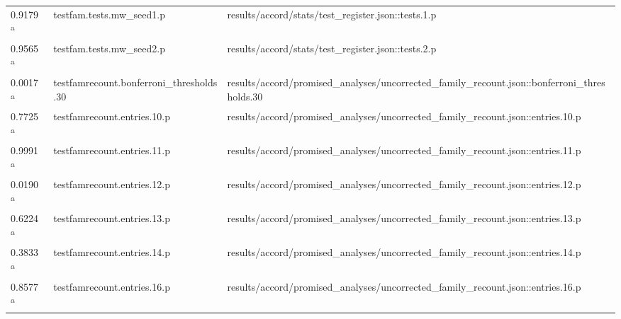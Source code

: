 \begin{longtable}{@{}p{0.7in}p{1.9in}p{2.6in}@{}}
0.9179 \textsuperscript{a} & testfam.\allowbreak{}tests.\allowbreak{}mw\_seed1.\allowbreak{}p & results/\allowbreak{}accord/\allowbreak{}stats/\allowbreak{}test\_register.\allowbreak{}json::tests.\allowbreak{}1.\allowbreak{}p\\
0.9565 \textsuperscript{a} & testfam.\allowbreak{}tests.\allowbreak{}mw\_seed2.\allowbreak{}p & results/\allowbreak{}accord/\allowbreak{}stats/\allowbreak{}test\_register.\allowbreak{}json::tests.\allowbreak{}2.\allowbreak{}p\\
0.0017 \textsuperscript{a} & testfamrecount.\allowbreak{}bonferroni\_thresholds.\allowbreak{}30 & results/\allowbreak{}accord/\allowbreak{}promised\_analyses/\allowbreak{}uncorrected\_family\_recount.\allowbreak{}json::bonferroni\_thresholds.\allowbreak{}30\\
0.7725 \textsuperscript{a} & testfamrecount.\allowbreak{}entries.\allowbreak{}10.\allowbreak{}p & results/\allowbreak{}accord/\allowbreak{}promised\_analyses/\allowbreak{}uncorrected\_family\_recount.\allowbreak{}json::entries.\allowbreak{}10.\allowbreak{}p\\
0.9991 \textsuperscript{a} & testfamrecount.\allowbreak{}entries.\allowbreak{}11.\allowbreak{}p & results/\allowbreak{}accord/\allowbreak{}promised\_analyses/\allowbreak{}uncorrected\_family\_recount.\allowbreak{}json::entries.\allowbreak{}11.\allowbreak{}p\\
0.0190 \textsuperscript{a} & testfamrecount.\allowbreak{}entries.\allowbreak{}12.\allowbreak{}p & results/\allowbreak{}accord/\allowbreak{}promised\_analyses/\allowbreak{}uncorrected\_family\_recount.\allowbreak{}json::entries.\allowbreak{}12.\allowbreak{}p\\
0.6224 \textsuperscript{a} & testfamrecount.\allowbreak{}entries.\allowbreak{}13.\allowbreak{}p & results/\allowbreak{}accord/\allowbreak{}promised\_analyses/\allowbreak{}uncorrected\_family\_recount.\allowbreak{}json::entries.\allowbreak{}13.\allowbreak{}p\\
0.3833 \textsuperscript{a} & testfamrecount.\allowbreak{}entries.\allowbreak{}14.\allowbreak{}p & results/\allowbreak{}accord/\allowbreak{}promised\_analyses/\allowbreak{}uncorrected\_family\_recount.\allowbreak{}json::entries.\allowbreak{}14.\allowbreak{}p\\
0.8577 \textsuperscript{a} & testfamrecount.\allowbreak{}entries.\allowbreak{}16.\allowbreak{}p & results/\allowbreak{}accord/\allowbreak{}promised\_analyses/\allowbreak{}uncorrected\_family\_recount.\allowbreak{}json::entries.\allowbreak{}16.\allowbreak{}p\\

\end{longtable}
